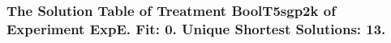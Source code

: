  \begin{frame}
 \fontsize{8pt}{9pt}\selectfont
 \frametitle{ The Solution Table of Treatment BoolT5sgp2k of Experiment ExpE. Fit: 0. Unique Shortest Solutions: 13. }

 \label{ExpESolutionTable005.tex}  
 \end{frame}

